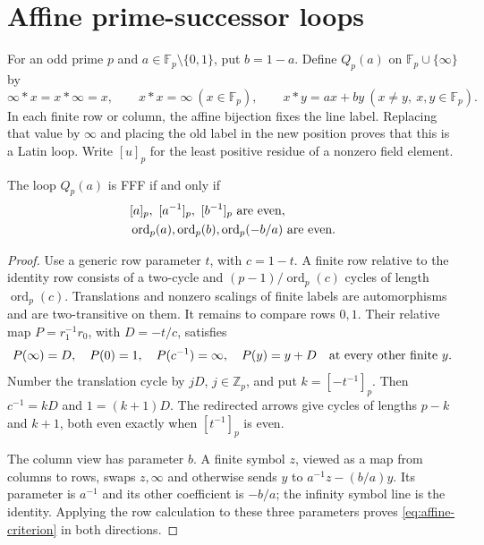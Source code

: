 \section{Affine prime-successor loops}
\label{sec:affine-prime}

For an odd prime $p$ and $a\in\mathbb F_p\setminus\{0,1\}$, put
$b=1-a$. Define $Q_p(a)$ on $\mathbb F_p\cup\{\infty\}$ by
\[
 \infty*x=x*\infty=x,\qquad x*x=\infty\ (x\in\mathbb F_p),
 \qquad x*y=ax+by\ (x\ne y,\ x,y\in\mathbb F_p).
\]
In each finite row or column, the affine bijection fixes the line
label. Replacing that value by $\infty$ and placing the old label
in the new position proves that this is a Latin loop.
Write $[u]_p$ for the least positive residue of a nonzero field element.

\begin{theorem}
\label{thm:affine-criterion}
The loop $Q_p(a)$ is FFF if and only if
\begin{equation}
\begin{split}
 &[a]_p,\ [a^{-1}]_p,\ [b^{-1}]_p\ \hbox{are even},\\
 &\operatorname{ord}_p(a),\operatorname{ord}_p(b),
 \operatorname{ord}_p(-b/a)\ \hbox{are even}.
\end{split}
 \label{eq:affine-criterion}
\end{equation}
\end{theorem}

\begin{proof}
Use a generic row parameter $t$, with $c=1-t$. A finite row
relative to the identity row consists of a two-cycle and
$(p-1)/\operatorname{ord}_p(c)$ cycles of length
$\operatorname{ord}_p(c)$. Translations and nonzero scalings of
finite labels are automorphisms and are two-transitive on them.
It remains to compare rows $0,1$. Their relative map
$P=r_1^{-1}r_0$, with $D=-t/c$, satisfies
\[
 P(\infty)=D,\quad P(0)=1,\quad P(c^{-1})=\infty,\quad
 P(y)=y+D\quad\hbox{at every other finite }y.
\]
Number the translation cycle by $jD$, $j\in\mathbb Z_p$, and
put $k=[-t^{-1}]_p$. Then $c^{-1}=kD$ and $1=(k+1)D$.
The redirected arrows give cycles of lengths $p-k$ and $k+1$,
both even exactly when $[t^{-1}]_p$ is even.

The column view has parameter $b$. A finite symbol $z$, viewed
as a map from columns to rows, swaps $z,\infty$ and otherwise
sends $y$ to $a^{-1}z-(b/a)y$. Its parameter is $a^{-1}$ and
its other coefficient is $-b/a$; the infinity symbol line is
the identity. Applying the row calculation to these three
parameters proves \eqref{eq:affine-criterion} in both directions.
\end{proof}

